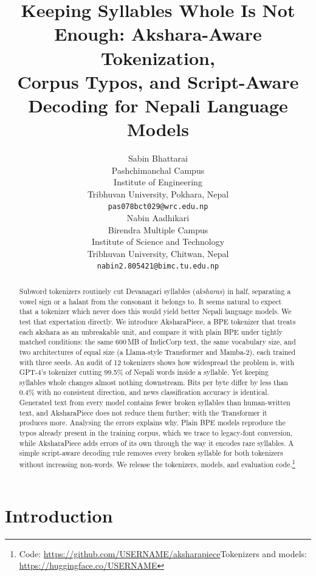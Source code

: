 \documentclass[11pt]{article}
\title{Keeping Syllables Whole Is Not Enough: Akshara-Aware Tokenization,\\
Corpus Typos, and Script-Aware Decoding for Nepali Language Models}
\author{Sabin Bhattarai \\
  Pashchimanchal Campus \\
  Institute of Engineering \\
  Tribhuvan University, Pokhara, Nepal \\
  \texttt{pas078bct029@wrc.edu.np} \\\And
  Nabin Aadhikari \\
  Birendra Multiple Campus \\
  Institute of Science and Technology \\
  Tribhuvan University, Chitwan, Nepal \\
  \texttt{nabin2.805421@bimc.tu.edu.np} \\}
\newcommand{\ap}{AksharaPiece}
\begin{document}
\maketitle

\begin{abstract}
Subword tokenizers routinely cut Devanagari syllables (\emph{aksharas}) in half, separating a vowel sign or a halant from the consonant it belongs to. It seems natural to expect that a tokenizer which never does this would yield better Nepali language models. We test that expectation directly. We introduce \ap{}, a BPE tokenizer that treats each akshara as an unbreakable unit, and compare it with plain BPE under tightly matched conditions: the same 600\,MB of IndicCorp text, the same vocabulary size, and two architectures of equal size (a Llama-style Transformer and Mamba-2), each trained with three seeds. An audit of 12 tokenizers shows how widespread the problem is, with GPT-4's tokenizer cutting 99.5\% of Nepali words inside a syllable. Yet keeping syllables whole changes almost nothing downstream. Bits per byte differ by less than 0.4\% with no consistent direction, and news classification accuracy is identical. Generated text from every model contains fewer broken syllables than human-written text, and \ap{} does not reduce them further; with the Transformer it produces more. Analysing the errors explains why. Plain BPE models reproduce the typos already present in the training corpus, which we trace to legacy-font conversion, while \ap{} adds errors of its own through the way it encodes rare syllables. A simple script-aware decoding rule removes every broken syllable for both tokenizers without increasing non-words. We release the tokenizers, models, and evaluation code.\footnote{\raggedright Code: \url{https://github.com/USERNAME/aksharapiece}\newline Tokenizers and models: \url{https://huggingface.co/USERNAME}}
\end{abstract}

\section{Introduction}
\end{document}
